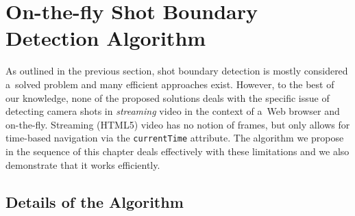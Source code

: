 \section{On-the-fly Shot Boundary Detection Algorithm}
\label{sec:details-of-algo}

As outlined in the previous section,
shot boundary detection is mostly considered a~solved problem
and many efficient approaches exist.
However, to the best of our knowledge,
none of the proposed solutions deals with
the specific issue of detecting camera shots in \emph{streaming} video
in the context of a~Web browser and on-the-fly.
Streaming (HTML5) video has no notion of frames,
but only allows for time-based navigation
via the \texttt{currentTime} attribute.
The algorithm we propose in the sequence of this chapter 
deals effectively with these limitations
and we also demonstrate that it works efficiently.

\subsection{Details of the Algorithm}

